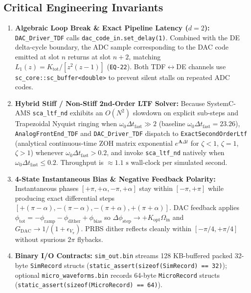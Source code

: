 \documentclass[11pt,a4paper]{article}
\begin{document}
\subsection{Critical Engineering Invariants}
\begin{enumerate}
    \item \textbf{Algebraic Loop Break \& Exact Pipeline Latency ($d=2$):} \texttt{DAC\_Driver\_TDF} calls \texttt{dac\_code\_in.set\_delay(1)}. Combined with the DE delta-cycle boundary, the ADC sample corresponding to the DAC code emitted at slot $n$ returns at slot $n+2$, matching $L_1(z) = K_{\text{tot}}/[z^2(z-1)]$ (\texttt{EQ-22}). Both TDF$\leftrightarrow$DE channels use \texttt{sc\_core::sc\_buffer<double>} to prevent silent stalls on repeated ADC codes.
    \item \textbf{Hybrid Stiff / Non-Stiff 2nd-Order LTF Solver:} Because SystemC-AMS \texttt{sca\_ltf\_nd} exhibits an $O(N^2)$ slowdown on explicit sub-steps and Trapezoidal Nyquist ringing when $\omega_0 \Delta t_{\text{fast}} \gg 2$ (baseline $\omega_0 \Delta t_{\text{fast}} = 23.26$), \texttt{AnalogFrontEnd\_TDF} and \texttt{DAC\_Driver\_TDF} dispatch to \texttt{ExactSecondOrderLtf} (analytical continuous-time ZOH matrix exponential $e^{\mathbf{A}\Delta t}$ for $\zeta < 1$, $\zeta = 1$, $\zeta > 1$) whenever $\omega_0 \Delta t_{\text{fast}} > 0.2$, and invoke \texttt{sca\_ltf\_nd} natively when $\omega_0 \Delta t_{\text{fast}} \le 0.2$. Throughput is $\approx 1.1\text{ s}$ wall-clock per simulated second.
    \item \textbf{4-State Instantaneous Bias \& Negative Feedback Polarity:} Instantaneous phases $[+\pi, +\alpha, -\pi, +\alpha]$ stay within $[-\pi, +\pi]$ while producing exact differential steps $[+(\pi-\alpha), -(\pi-\alpha), -(\pi+\alpha), +(\pi+\alpha)]$. DAC feedback applies $\phi_{\text{tot}} = -\phi_{\text{ramp}} - \phi_{\text{dither}} + \phi_{\text{bias}}$ so $\Delta\phi_{\text{step}} \to +K_{\text{opt}}\Omega_{\text{in}}$ and $G_{\text{DAC}} \to 1/(1+\epsilon_{V_\pi})$. PRBS dither reflects cleanly within $[-\pi/4, +\pi/4]$ without spurious $2\pi$ flybacks.
    \item \textbf{Binary I/O Contracts:} \texttt{sim\_out.bin} streams 128 KB-buffered packed 32-byte \texttt{SimRecord} structs (\texttt{static\_assert(sizeof(SimRecord) == 32)}); optional \texttt{micro\_waveforms.bin} records 64-byte \texttt{MicroRecord} structs (\texttt{static\_assert(sizeof(MicroRecord) == 64)}).
\end{enumerate}
\end{document}
